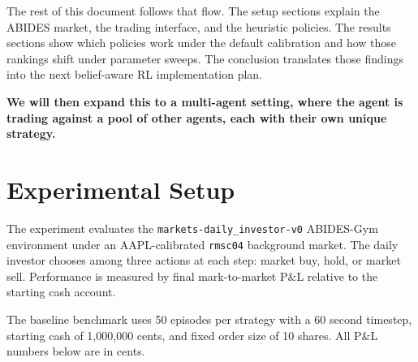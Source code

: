 \documentclass[11pt]{article}
\begin{document}
The rest of this document follows that flow. The setup sections explain the
ABIDES market, the trading interface, and the heuristic policies. The results
sections show which policies work under the default calibration and how those
rankings shift under parameter sweeps. The conclusion translates those findings
into the next belief-aware RL implementation plan.

\textbf{We will then expand this to a multi-agent setting, where the agent is trading against a pool of other agents, each with their own unique strategy.}

\section{Experimental Setup}

The experiment evaluates the \texttt{markets-daily\_investor-v0} ABIDES-Gym
environment under an AAPL-calibrated \texttt{rmsc04} background market. The
daily investor chooses among three actions at each step: market buy, hold, or
market sell. Performance is measured by final mark-to-market P\&L relative to
the starting cash account.

The baseline benchmark uses 50 episodes per strategy with a 60 second timestep,
starting cash of 1,000,000 cents, and fixed order size of 10 shares. All P\&L
numbers below are in cents.
\end{document}
